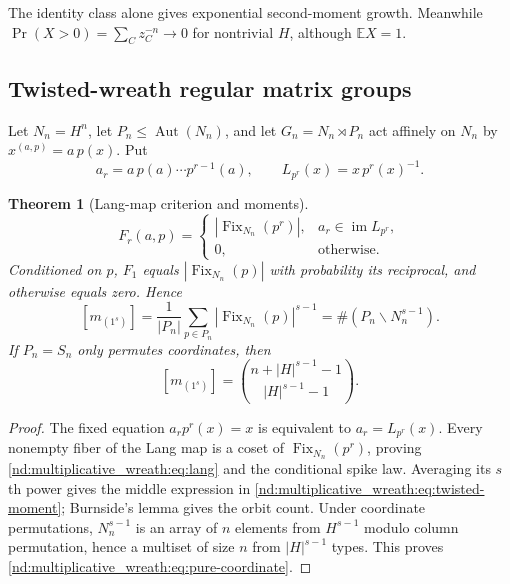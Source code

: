 \documentclass[10pt]{article}
\newcommand{\Fix}{\operatorname{Fix}}
\newcommand{\E}{\mathbb E}
\newcommand{\im}{\operatorname{im}}
\newtheorem{theorem}{Theorem}
\begin{document}
The identity class alone gives exponential second-moment growth.  Meanwhile
$\Pr(X>0)=\sum_Cz_C^{-n}\to0$ for nontrivial $H$, although $\E X=1$.

\subsection{Twisted-wreath regular matrix groups}

Let $N_n=H^n$, let $P_n\le\operatorname{Aut}(N_n)$, and let
$G_n=N_n\rtimes P_n$ act affinely on $N_n$ by
$x^{(a,p)}=a\,p(x)$.  Put
\[
 a_r=a\,p(a)\cdots p^{r-1}(a),
 \qquad L_{p^r}(x)=x\,p^r(x)^{-1}.
\]

\begin{theorem}[Lang-map criterion and moments]\label{nd:multiplicative_wreath:thm:twisted}
\begin{equation}\label{nd:multiplicative_wreath:eq:lang}
 F_r(a,p)=\begin{cases}
 |\Fix_{N_n}(p^r)|,&a_r\in\im L_{p^r},\\
 0,&\text{otherwise}.
 \end{cases}
\end{equation}
Conditioned on $p$, $F_1$ equals $|\Fix_{N_n}(p)|$ with probability its
reciprocal, and otherwise equals zero.  Hence
\begin{equation}\label{nd:multiplicative_wreath:eq:twisted-moment}
 \boxed{[m_{(1^s)}]=\frac1{|P_n|}\sum_{p\in P_n}
 |\Fix_{N_n}(p)|^{s-1}=\#(P_n\backslash N_n^{s-1}).}
\end{equation}
If $P_n=S_n$ only permutes coordinates, then
\begin{equation}\label{nd:multiplicative_wreath:eq:pure-coordinate}
 \boxed{[m_{(1^s)}]=
 \binom{n+|H|^{s-1}-1}{|H|^{s-1}-1}.}
\end{equation}
\end{theorem}

\begin{proof}
The fixed equation $a_rp^r(x)=x$ is equivalent to
$a_r=L_{p^r}(x)$.  Every nonempty fiber of the Lang map is a coset of
$\Fix_{N_n}(p^r)$, proving \eqref{nd:multiplicative_wreath:eq:lang} and the conditional spike law.
Averaging its $s$th power gives the middle expression in
\eqref{nd:multiplicative_wreath:eq:twisted-moment}; Burnside's lemma gives the orbit count.  Under
coordinate permutations, $N_n^{s-1}$ is an array of $n$ elements from
$H^{s-1}$ modulo column permutation, hence a multiset of size $n$ from
$|H|^{s-1}$ types.  This proves \eqref{nd:multiplicative_wreath:eq:pure-coordinate}.
\end{proof}
\end{document}

